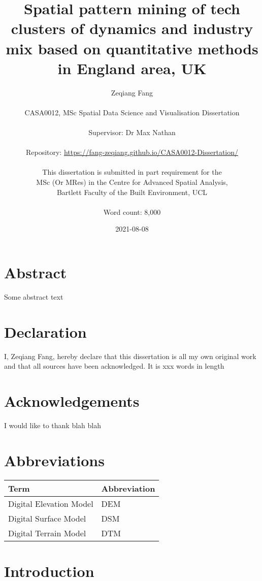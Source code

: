 \documentclass[
  12pt,
  oneside]{book}
\title{Spatial pattern mining of tech clusters of dynamics and industry mix based on quantitative methods in England area, UK}
\author{Zeqiang Fang\\
~\\
CASA0012, MSc Spatial Data Science and Visualisation Dissertation\\
~\\
Supervisor: Dr Max Nathan\\
~\\
Repository: \url{https://fang-zeqiang.github.io/CASA0012-Dissertation/}\\
~\\
This dissertation is submitted in part requirement for the\\
MSc (Or MRes) in the Centre for Advanced Spatial Analysis,\\
Bartlett Faculty of the Built Environment, UCL\\
~\\
Word count: 8,000}
\date{2021-08-08}
\begin{document}
\maketitle


\hypertarget{abstract}{%
\chapter*{Abstract}\label{abstract}}

Some abstract text


\hypertarget{declaration}{%
\chapter*{Declaration}\label{declaration}}

I, Zeqiang Fang, hereby declare that this dissertation is all my own original work and that all sources have been acknowledged. It is xxx words in length

\hypertarget{acknowledgements}{%
\chapter*{Acknowledgements}\label{acknowledgements}}

I would like to thank blah blah

\setcounter{tocdepth}{3}
\tableofcontents
\listoffigures
\listoftables

\hypertarget{abbreviations}{%
\chapter*{Abbreviations}\label{abbreviations}}

\begin{table}
\centering
\begin{tabular}{ll}
\toprule
\textbf{Term} & \textbf{Abbreviation}\\
\midrule
Digital Elevation Model & DEM\\
Digital Surface Model & DSM\\
Digital Terrain Model & DTM\\
\bottomrule
\end{tabular}
\end{table}

\hypertarget{introduction}{%
\chapter{Introduction}\label{introduction}}
\end{document}
